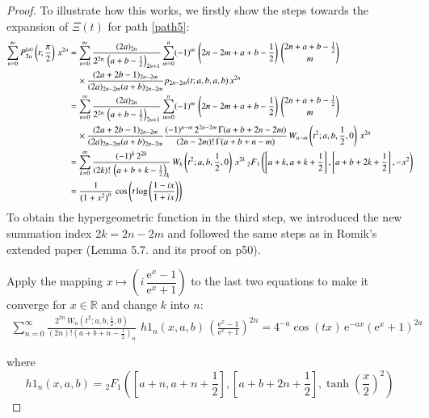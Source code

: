 \documentclass[a4paper,11pt,twoside]{amsart}
\newcommand{\verifiedeq}{=}
\newcommand{\defeq}{=}
\newcommand{\verifiedeq}{\stackrel{\checkmark}{=}}
\newcommand{\defeq}{\stackrel{\scriptscriptstyle \textnormal{def}}{=}}
\begin{document}
\begin{proof}
To illustrate how this works, we firstly show the steps towards the expansion of $\Xi(t)$ for path \ref{path5}: 
\begin{align}
\sum_{n=0}^\infty P_{2n}^{(a)}\left(t;\frac{\pi}{2}\right)\,x^{2n} &\defeq\sum_{n=0}^\infty \frac{(2a)_{2n}}{2^{2n}\,\left(a+b-\frac12\right)_{2n+1}} \sum_{m=0}^n (-1)^m\,\left(2n-2m+a+b-\frac12\right)\,\binom{2n+a+b-\frac12}{m}\, \notag \\ &\quad\times \frac{(2a+2b-1)_{2n-2m}}{(2a)_{2n-2m}(a+b)_{2n-2m}} p_{2n-2m}(t;a,b,a,b)\,x^{2n} \notag \\
 &\defeq\sum_{n=0}^\infty \frac{(2a)_{2n}}{2^{2n}\,\left(a+b-\frac12\right)_{2n+1}} \sum_{m=0}^n (-1)^m\,\left(2n-2m+a+b-\frac12\right)\,\binom{2n+a+b-\frac12}{m}\,  \notag\\ &\quad\times \frac{(2a+2b-1)_{2n-2m}}{(2a)_{2n-2m}(a+b)_{2n-2m}} \frac{(-1)^{n-m}\,2^{2n-2m}\,\Gamma(a+b+2n-2m)}{(2n-2m)!\,\Gamma(a+b+n-m)}\,W_{n-m}\left(t^2;a,b,\frac12,0\right)\,x^{2n}\notag\\
 &\defeq\sum_{k=0}^\infty \frac{(-1)^k\,2^{2k}}{(2k)!\,\left(a+b+k-\frac12\right)_{k}}\,W_k\left(t^2;a,b,\frac12,0\right)\,x^{2k}\,{}_2F_1\left(\left[a+k, a+k+\frac12\right],\left[a+b+2k+\frac12\right],-x^2\right) \\
 &\defeq \frac{1}{\left(1+x^2\right)^a}\, \cos\left(t\log\left(\frac{1-ix}{1+ix}\right)\right)
\end{align}
To obtain the hypergeometric function in the third step, we introduced the new summation index $2k = 2n-2m$ and followed the same steps as in Romik's extended paper (Lemma 5.7. and its proof on p50). 

Apply the mapping $x \mapsto \left(i\,\dfrac{\textrm{e}^{x}-1}{\textrm{e}^{x}+1}\right)$ to the last two equations to make it converge for $x \in \mathbb{R}$ and change $k$ into $n$:
\begin{align}
\sum_{n=0}^\infty \frac{2^{2n}\,W_n\left(t^2;a,b,\frac12,0\right)}{(2n)!\left(a+b+n-\frac12\right)_n}\, \,h1_n(x,a,b)\,\left(\frac{\textrm{e}^{x}-1}{\textrm{e}^{x}+1}\right)^{2n} \verifiedeq 4^{-a}\cos(tx)\,\mathrm{e}^{-ax}\left(\mathrm{e}^x+1\right)^{2a} 
\end{align}

where $$h1_n(x,a,b) \defeq {}_2F_1\left(\left[a+n, a+n+\frac12\right],\left[a+b+2n+\frac12\right],\tanh\left(\frac{x}{2}\right)^2\right)$$


\end{proof}
\end{document}
